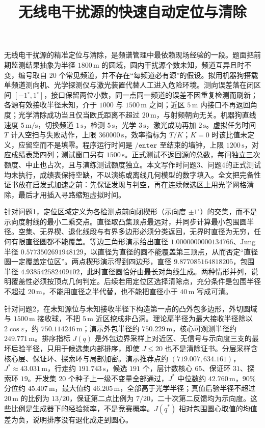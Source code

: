 \documentclass[withoutpreface,bwprint]{cumcmthesis}
\title{无线电干扰源的快速自动定位与清除}
\makeatletter
\renewenvironment{abstract}{%
  \if@twocolumn\section*{\abstractname}%
  \else\begin{center}{\zihao{4}\bfseries \abstractname\vspace{-.5em}\vspace{\z@}}\end{center}\quotation
  \fi}{\if@twocolumn\else\endquotation\newpage\fi}
\makeatother
\begin{document}
\maketitle

\begin{abstract}

无线电干扰源的精准定位与清除，是频谱管理中最依赖现场经验的一段。题面把前期监测结果抽象为半径 $1800\,\mathrm{m}$ 的圆域，圆内干扰源个数未知，频道互异且时不变，编号取自 $20$ 个常见频道，并不存在“每频道必有源”的假设。拟用机器狗搭载单频道测向机、光学探测仪与激光装置代替人工进入危险环境。测向误差落在闭区间 $[-1^\circ,1^\circ]$，接口保留两位小数，同一点同一频道的误差不因重复检测而刷新；各源有效接收半径未知，介于 $1000$ 与 $1500\,\mathrm{m}$ 之间；近区 $5\,\mathrm{m}$ 内接口不再返回角度；光学清除成功当且仅当欧氏距离不超过 $20\,\mathrm{m}$，与射频朝向无关。机器狗直线速度 $5\,\mathrm{m/s}$，切换频道 $1\,\mathrm{s}$，检测 $5\,\mathrm{s}$，光学 $3\,\mathrm{s}$，激光成功再加 $2\,\mathrm{s}$。虚拟任务时间 $T$ 计入空扫与失败动作，上限 $360000\,\mathrm{s}$，效率指标为 $T/K$；$K=0$ 时该比值未定义，应留空而不是填零。程序运行时间是 $\mathtt{/enter}$ 至结束的墙钟，上限 $1200\,\mathrm{s}$，对应成绩表第四列；测试窗口另有 $1500\,\mathrm{s}$。正式测试不返回源的总数，每问独立三次额度、中止也占次，且与演练测试额度独立。本文写作时问题3、问题4的正式测试均未执行，成绩表保持空缺，不以演练或离线几何模型的数字填入。全文把完备性证书放在启发式加速之前：先保证发现与判空，再在连续候选区上用光学网格清除，最后才用插入寻路缩短虚拟时间。

针对问题1，定位区域定义为各检测点前向闭楔形（示向度 $\pm 1^\circ$）的交集，而不是示向度射线的最小二乘交点。直径取凸集顶点最远对，并同步计算最小包围圆半径。空集、无界楔、退化线段与有界多边形必须分类返回，无界时直径为无穷，任何有限直径圆都不能覆盖。等边三角形演示给出直径 $1.0000000000134766$、Jung 半径 $0.5773502691948129$，以直径为直径的圆不能覆盖第三顶点，从而否定“直径圆一定覆盖定位区”。两点楔形演示得到四边形，直径 $9.877085164818205$，包围半径 $4.938542582409102$，此时直径圆恰好由最长对角线生成。两种情形并列，说明覆盖性必须按顶点几何判定。后续若用定位区选择清除点，充分条件是包围半径不超过 $20\,\mathrm{m}$，不能用直径之半代替，也不能把直径小于 $40\,\mathrm{m}$ 写成可清。

针对问题2，在未知源位与未知接收半径下构造第一点的凸外包多边形，外切圆域与 $1500\,\mathrm{m}$ 接收球，不把 $5\,\mathrm{m}$ 近区挖成非凸洞。理论扇半径为最大接收半径除以 $2\cos\varepsilon$，约 $750.114246\,\mathrm{m}$；演示外包半径约 $750.229\,\mathrm{m}$，核心可观测半径约 $249.771\,\mathrm{m}$。排序指标 $J(q)$ 是外包边界采样上对近区、无信号与示向度三支的最坏后验半径，只用于候选集内部排序，即使 $J\le 20$ 也不是清除证书。分层采样含核心层、保证环、探索环与局部加密。演示推荐点约 $(719.007,634.161)$，$J^\ast\approx 43.031\,\mathrm{m}$，行走约 $191.743\,\mathrm{s}$，候选 $191$ 个，层计数核心 $65$、保证环 $31$、探索环 $19$。开发集 $20$ 个种子上一级不变量全部通过，$J^\ast$ 中位数约 $42.760\,\mathrm{m}$，$90\%$ 分位约 $45.407\,\mathrm{m}$，最大值约 $46.205\,\mathrm{m}$，全部高于光学半径；真值后验半径不超过 $20\,\mathrm{m}$ 的比例为 $13/20$，保证第二点比例为 $7/20$，二十次第二反馈均为示向度。这些比例是生成器下的经验频率，不是竞赛概率。$J(q^\ast)$ 相对包围圆心取值的均值差为负，说明排序没有退化成走到圆心。


\end{abstract}
\end{document}
